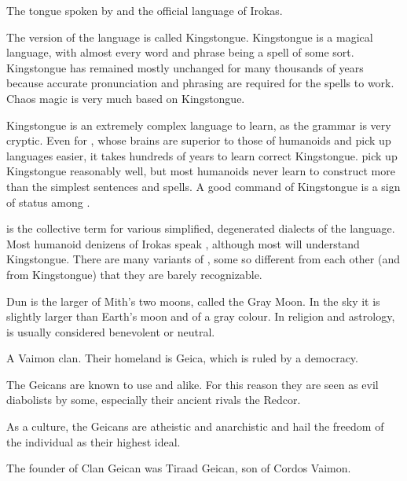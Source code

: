 \begin{gloss}



The tongue spoken by \dragons{} and the official language of Irokas. 

The  version of the language is called Kingstongue. Kingstongue is a magical language, with almost every word and phrase being a spell of some sort. Kingstongue has remained mostly unchanged for many thousands of years because accurate pronunciation and phrasing are required for the spells to work. Chaos magic is very much based on Kingstongue. 

Kingstongue is an extremely complex language to learn, as the grammar is very cryptic. Even for \dragons{}, whose brains are superior to those of humanoids and pick up languages easier, it takes hundreds of years to learn correct Kingstongue. \Rachyth{} pick up Kingstongue reasonably well, but most humanoids never learn to construct more than the simplest sentences and spells. A good command of Kingstongue is a sign of status among \dragons{}. 

\quo{\Lowtongue{}} is the collective term for various simplified, degenerated dialects of the language. Most humanoid denizens of Irokas speak \Lowtongue, although most will understand Kingstongue. There are many variants of \Lowtongue, some so different from each other (and from Kingstongue) that they are barely recognizable. 



\gitem{\Dun}
Dun is the larger of Mith's two moons, called the Gray Moon. In the sky it is slightly larger than Earth's moon and of a gray colour. In religion and astrology, \Dun{} is usually considered benevolent or neutral. 



A Vaimon clan. Their homeland is Geica, which is ruled by a democracy. 

The Geicans are known to use \nieur{} and \iquin{} alike. For this reason they are seen as evil diabolists by some, especially their ancient rivals the Redcor. 

As a culture, the Geicans are atheistic and anarchistic and hail the freedom of the individual as their highest ideal. 

The founder of Clan Geican was Tiraad Geican, son of Cordos Vaimon. 


\end{gloss}
